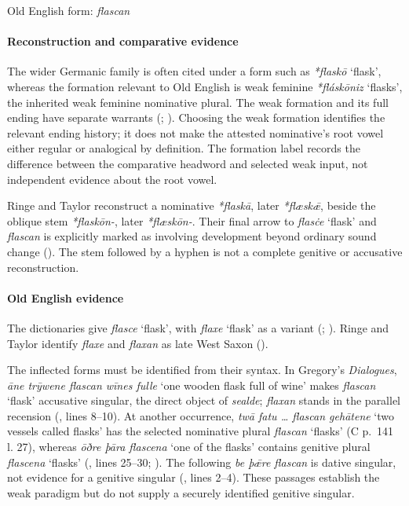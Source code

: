 \documentclass[
  british,
  a4paper,
]{article}
\providecommand{\Recon}[1]{\emph{*#1}}
\begin{document}
Old English form: \emph{flascan}

\paragraph{Reconstruction and comparative
evidence}\label{reconstruction-and-comparative-evidence-22}

The wider Germanic family is often cited under a form such as
\Recon{flaskō} `flask', whereas the formation relevant to Old English is
weak feminine \Recon{fláskōniz} `flasks', the inherited weak feminine
nominative plural. The weak formation and its full ending have separate
warrants (;
). Choosing the weak
formation identifies the relevant ending history; it does not make the
attested nominative's root vowel either regular or analogical by
definition. The formation label records the difference between the
comparative headword and selected weak input, not independent evidence
about the root vowel.

Ringe and Taylor reconstruct a nominative \emph{*flaskā}, later
\emph{*flæskǣ}, beside the oblique stem \emph{*flaskōn-}, later
\emph{*flæskōn-}. Their final arrow to \emph{flasċe} `flask' and
\emph{flascan} is explicitly marked as involving development beyond
ordinary sound change (). The stem followed by a hyphen is not a complete genitive or
accusative reconstruction.

\paragraph{Old English evidence}\label{old-english-evidence-22}

The dictionaries give {\emph{flasce}} `flask', with {\emph{flaxe}}
`flask' as a variant (; ).
Ringe and Taylor identify \emph{flaxe} and \emph{flaxan} as late West
Saxon ().

The inflected forms must be identified from their syntax. In Gregory's
\emph{Dialogues}, \emph{āne trȳwene flascan wīnes fulle} `one wooden
flask full of wine' makes {\emph{flascan}} `flask' accusative singular,
the direct object of \emph{sealde}; \emph{flaxan} stands in the parallel
recension (, lines 8--10). At
another occurrence, \emph{twā fatu \ldots{} flascan gehātene} `two
vessels called flasks' has the selected nominative plural
{\emph{flascan}} `flasks' (C p.~141 l. 27), whereas \emph{ōðre þāra
flascena} `one of the flasks' contains genitive plural {\emph{flascena}}
`flasks' (, lines 25--30;
). The following \emph{be
þǣre flascan} is dative singular, not evidence for a genitive singular
(, lines 2--4). These passages
establish the weak paradigm but do not supply a securely identified
genitive singular.
\end{document}
